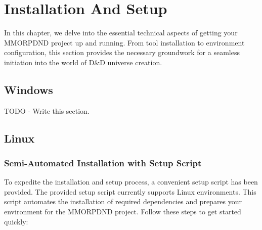 \chapter{Installation And Setup}

In this chapter, we delve into the essential technical aspects of getting your MMORPDND project up and running. From tool installation to environment configuration, this section provides the necessary groundwork for a seamless initiation into the world of D\&D universe creation.

\section{Windows}

TODO - Write this section.

\section{Linux}

\subsection{Semi-Automated Installation with Setup Script}

To expedite the installation and setup process, a convenient setup script has been provided. The provided setup script currently supports Linux environments. This script automates the installation of required dependencies and prepares your environment for the MMORPDND project. Follow these steps to get started quickly:

